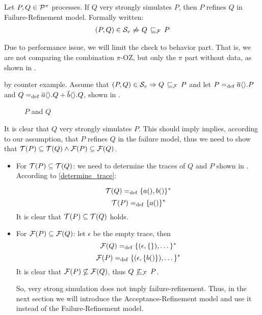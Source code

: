 \begin{cor}
\label{cor_sim_failure_refinement}
Let $P,Q\in\mathcal P^{\pi}$ processes. If $Q$ very strongly simulates $P$, then $P$ refines $Q$ in Failure-Refinement model. Formally written:
\begin{align}
    (P,Q)\in{}\simuv  \not\Rightarrow Q \refiF P
   \label{failure_model}
\end{align}
\end{cor}%
 Due to performance issue, we will limit the check to behavior part. That is, we are not comparing the combination $\pi$-OZ, but only the $\pi$ part without data, as shown in .
\begin{prf}
by counter example. Assume that $(P,Q)\in{}\simuv \Rightarrow Q \refiF P$ and let $P=_{\mathrm{def}}\overline{a}\langle\rangle.P$ and $Q=_{\mathrm{def}}\overline{a}\langle\rangle.Q + \overline{b}\langle\rangle.Q$, shown in .
\begin{figure}[H]%
\centering
{}%
\qquad
{}%
\caption{$P$ and $Q$}
\label{vm_and_vmHalf}
\end{figure}

It is clear that $Q$ very strongly simulates $P$. This should imply implies, according to our assumption, that $P$ refines $Q$ in the failure model, thus we need to show that $\Traces[P]\subseteq\Traces[Q] \wedge \Failures[P]\subseteq\Failures[Q]$.
\begin{itemize}
\item For $\Traces[P]\subseteq\Traces[Q]$: we need to determine the traces of $Q$ and $P$  shown in . According to \ref{determine_trace}:

    \[\Traces[Q] \define \{a(),b()\}^\ast\]
    \[\Traces[P] \define \{a()\}^\ast\]
It is clear that $\Traces[P]\subseteq\Traces[Q]$ holds. 

\item For $\Failures[P]\subseteq\Failures[Q]$: let $\epsilon$ be the empty trace, then
    \[\Failures[Q] \define \{(\epsilon,\{\}),\dots\}^\ast\]
    \[\Failures[P] \define \{(\epsilon,\{b()\}),\dots\}^\ast\]
It is clear that $\Failures[P]\not\subseteq\Failures[Q]$, thus $Q \not\refiF P$.

So, very strong simulation does not imply failure-refinement. Thus, in the next section we will introduce the Acceptance-Refinement model and use it instead of the Failure-Refinement model.
\end{itemize}
\end{prf}
